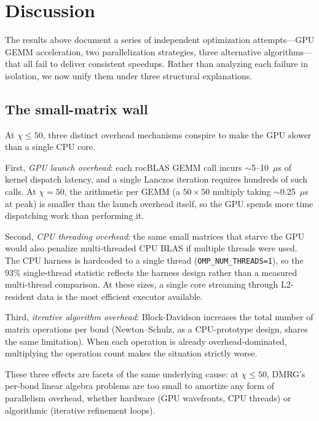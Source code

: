 \documentclass[preprint,12pt]{elsarticle}
\begin{document}
\section{Discussion}
\label{sec:discussion}

The results above document a series of independent optimization attempts---GPU GEMM acceleration, two parallelization strategies, three alternative algorithms---that all fail to deliver consistent speedups.  Rather than analyzing each failure in isolation, we now unify them under three structural explanations.

\subsection{The small-matrix wall}
\label{sec:small_matrix_wall}

At $\chi \leq 50$, three distinct overhead mechanisms conspire to make the GPU slower than a single CPU core.

First, \emph{GPU launch overhead}: each rocBLAS GEMM call incurs $\sim$5--10~$\mu$s of kernel dispatch latency, and a single Lanczos iteration requires hundreds of such calls.  At $\chi = 50$, the arithmetic per GEMM (a $50 \times 50$ multiply taking $\sim$0.25~$\mu$s at peak) is smaller than the launch overhead itself, so the GPU spends more time dispatching work than performing it.

Second, \emph{CPU threading overhead}: the same small matrices that starve the GPU would also penalize multi-threaded CPU BLAS if multiple threads were used. The CPU harness is hardcoded to a single thread (\texttt{OMP\_NUM\_THREADS=1}), so the 93\% single-thread statistic reflects the harness design rather than a measured multi-thread comparison. At these sizes, a single core streaming through L2-resident data is the most efficient executor available.

Third, \emph{iterative algorithm overhead}: Block-Davidson increases the total number of matrix operations per bond (Newton--Schulz, as a CPU-prototype design, shares the same limitation).  When each operation is already overhead-dominated, multiplying the operation count makes the situation strictly worse.

These three effects are facets of the same underlying cause: at $\chi \leq 50$, DMRG's per-bond linear algebra problems are too small to amortize any form of parallelism overhead, whether hardware (GPU wavefronts, CPU threads) or algorithmic (iterative refinement loops).
\end{document}
